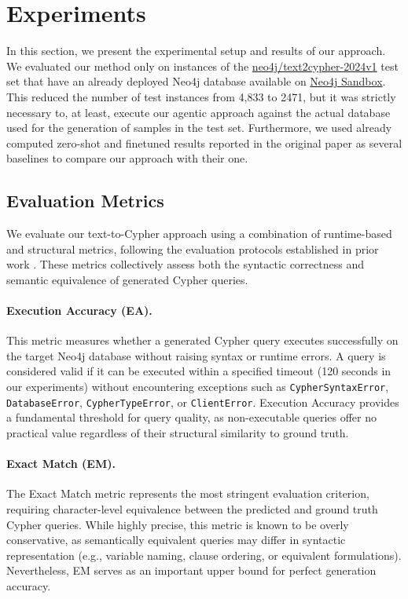 \section{Experiments}

In this section, we present the experimental setup and results of our approach. We evaluated our method only on instances of the \href{https://huggingface.co/datasets/neo4j/text2cypher-2024v1}{neo4j/text2cypher-2024v1} test set that have an already deployed Neo4j database available on \href{https://sandbox.neo4j.com/}{Neo4j Sandbox}. This reduced the number of test instances from 4,833 to 2471, but it was strictly necessary to, at least, execute our agentic approach against the actual database used for the generation of samples in the test set. Furthermore, we used already computed zero-shot and finetuned results reported in the original paper \cite{neo4jlabs-text2cypher-2024} as several baselines to compare our approach with their one.

\subsection{Evaluation Metrics}

We evaluate our text-to-Cypher approach using a combination of runtime-based and structural metrics, following the evaluation protocols established in prior work \cite{neo4jlabs-text2cypher-2024, cypherbench-megagonlabs-2024}. These metrics collectively assess both the syntactic correctness and semantic equivalence of generated Cypher queries.

\paragraph{Execution Accuracy (EA).} This metric measures whether a generated Cypher query executes successfully on the target Neo4j database without raising syntax or runtime errors. A query is considered valid if it can be executed within a specified timeout (120 seconds in our experiments) without encountering exceptions such as \texttt{CypherSyntaxError}, \texttt{DatabaseError}, \texttt{CypherTypeError}, or \texttt{ClientError}. Execution Accuracy provides a fundamental threshold for query quality, as non-executable queries offer no practical value regardless of their structural similarity to ground truth.

\paragraph{Exact Match (EM).} The Exact Match metric represents the most stringent evaluation criterion, requiring character-level equivalence between the predicted and ground truth Cypher queries. While highly precise, this metric is known to be overly conservative, as semantically equivalent queries may differ in syntactic representation (e.g., variable naming, clause ordering, or equivalent formulations). Nevertheless, EM serves as an important upper bound for perfect generation accuracy.

